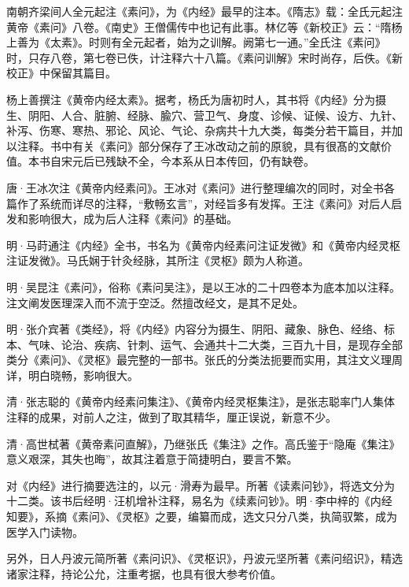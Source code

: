 \documentclass[draft,12pt]{ctexbook}
\begin{document}
南朝齐梁间人全元起注《素问》，为《内经》最早的注本。《隋志》载：全氏元起注黄帝《素问》八卷。《南史》王僧儒传中也记有此事。林亿等《新校正》云：“隋杨上善为《太素》。时则有全元起者，始为之训解。阙第七一通。”全氏注《素问》时，只存八卷，第七卷已佚，计注释六十八篇。《素问训解》宋时尚存，后佚。《新校正》中保留其篇目。

杨上善撰注《黄帝内经太素》。据考，杨氏为唐初时人，其书将《内经》分为摄生、阴阳、人合、脏腑、经脉、腧穴、营卫气、身度、诊候、证候、设方、九针、补泻、伤寒、寒热、邪论、风论、气论、杂病共十九大类，每类分若干篇目，并加以注释。书中有关《素问》部分保存了王冰改动之前的原貌，具有很髙的文献价值。本书自宋元后已残缺不全，今本系从日本传回，仍有缺卷。

唐·王冰次注《黄帝内经素问》。王冰对《素问》进行整理编次的同时，对全书各篇作了系统而详尽的注释，“敷畅玄言”，对经旨多有发挥。王注《素问》对后人启发和影响很大，成为后人注释《素问》的基础。

明·马莳通注《内经》全书，书名为《黄帝内经素问注证发微》和《黄帝内经灵枢注证发微》。马氏娴于针灸经脉，其所注《灵枢》颇为人称道。

明·吴昆注《素问》，俗称《素问吴注》，是以王冰的二十四卷本为底本加以注释。注文阐发医理深入而不流于空泛。然擅改经文，是其不足处。

明·张介宾著《类经》，将《内经》内容分为摄生、阴阳、藏象、脉色、经络、标本、气味、论治、疾病、针刺、运气、会通共十二大类，三百九十目，是现存全部类分《素问》、《灵枢》最完整的一部书。张氏的分类法扼要而实用，其注文义理周详，明白晓畅，影响很大。

清·张志聪的《黄帝内经素问集注》、《黄帝内经灵枢集注》，是张志聪率门人集体注释的成果，对前人之注，做到了取其精华，厘正误说，新意不少。

清·高世栻著《黄帝素问直解》，乃继张氏《集注》之作。高氏鉴于“隐庵《集注》意义艰深，其失也晦”，故其注着意于简捷明白，要言不繁。

对《内经》进行摘要选注的，以元·滑寿为最早。所著《读素问钞》，将选文分为十二类。该书后经明·汪机增补注释，易名为《续素问钞》。明·李中梓的《内经知要》，系摘《素问》、《灵枢》之要，编纂而成，选文只分八类，执简驭繁，成为医学入门读物。

另外，日人丹波元简所著《素问识》、《灵枢识》，丹波元坚所著《素问绍识》，精选诸家注释，持论公允，注重考据，也具有很大参考价值。

\ifx \allfiles \undefined
\end{document}
